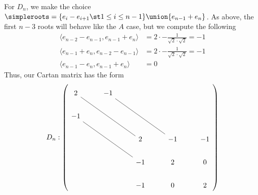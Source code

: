 \documentclass[11pt,leqno,oneside]{amsart}
\numberwithin{thm}{section}
\begin{document}
\begin{example}
For \(D_n\), we make the choice \(\simpleroots = \{e_i-e_{i+1} \st 1
\leq i \leq n-1\} \union \{e_{n-1}+e_n\}\). As above, the first
\(n-3\) roots will behave like the \(A\) case, but we compute the
following
\begin{align*}
  \langle e_{n-2}-e_{n-1}, e_{n-1}+e_n \rangle
  & = 2\cdot -\frac{1}{\sqrt{2}\cdot \sqrt{2}} = -1\\
  \langle e_{n-1}+e_n, e_{n-2}-e_{n-1} \rangle
  & = 2 \cdot -\frac{1}{\sqrt{2}\cdot \sqrt{2}} = -1\\
  \langle e_{n-1}-e_n, e_{n-1}+e_n \rangle
  & = 0
\end{align*}
Thus, our Cartan matrix has the form \[
D_n: \left(
  \begin{tikzcd}
    2\ar[rrdd,dash]&-1\ar[rrdd, dash]&&\\
    -1\ar[rrdd, dash]&&&\\
     &&2&-1&-1\\
    &&-1&2&0\\
    &&-1&0&2
  \end{tikzcd}
\right)
\]
\end{example}
\end{document}
